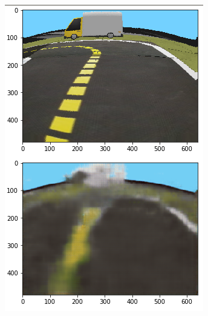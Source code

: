 \documentclass{article}
\begin{document}
\begin{figure}[!ht]
\begin{subfigure}[b]{.24\textwidth}
        \includegraphics[width=\textwidth]{vae3.png}
    \end{subfigure}
    \begin{subfigure}[b]{.24\textwidth}

\end{subfigure}
\end{figure}
\end{document}
